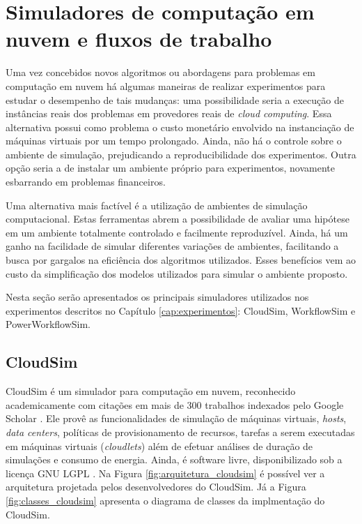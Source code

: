 \section{Simuladores de computação em nuvem e fluxos de trabalho}
\label{sec:ambiente_simulacao}
Uma vez concebidos novos algoritmos ou abordagens para problemas em computação
em nuvem há algumas maneiras de realizar experimentos para estudar o desempenho
de tais mudanças: uma possibilidade seria a execução de instâncias
reais dos problemas em provedores reais de \emph{cloud computing}. Essa alternativa
possui como problema o custo monetário envolvido na instanciação de máquinas
virtuais por um tempo prolongado. Ainda, não há o controle sobre o ambiente 
de simulação, prejudicando a reproducibilidade dos experimentos. Outra opção
seria a de instalar um ambiente próprio para experimentos, novamente esbarrando
em problemas financeiros. 

Uma alternativa mais factível é a utilização de ambientes de simulação computacional.
Estas ferramentas abrem a possibilidade de avaliar uma hipótese em um ambiente
totalmente controlado e facilmente reproduzível. Ainda, há um ganho na facilidade
de simular diferentes variações de ambientes, facilitando a busca por gargalos
na eficiência dos algoritmos utilizados. Esses benefícios vem ao custo da
simplificação dos modelos utilizados para simular o ambiente proposto.

Nesta seção serão apresentados os principais simuladores utilizados nos 
experimentos descritos no Capítulo \ref{cap:experimentos}: CloudSim, WorkflowSim
e PowerWorkflowSim.

\subsection{CloudSim}

CloudSim \cite{calheiros:cloudsim} é um simulador para computação em nuvem,
reconhecido academicamente com citações em mais de 300 trabalhos indexados pelo
Google Scholar \cite{google:cloudsim}. Ele provê as funcionalidades de simulação
de máquinas virtuais, \emph{hosts}, \emph{data centers}, políticas de
provisionamento de recursos, tarefas a serem executadas em máquinas virtuais
(\emph{cloudlets}) além de efetuar análises de duração de simulações e consumo
de energia. Ainda, é software livre, disponibilizado sob a licença GNU LGPL
\cite{cloudsim:site}. Na Figura \ref{fig:arquitetura_cloudsim} é possível ver a
arquitetura projetada pelos desenvolvedores do CloudSim. Já a Figura
\ref{fig:classes_cloudsim} apresenta o diagrama de classes da implmentação do
CloudSim.

